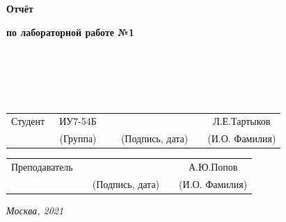 \begin{center}
	\vspace{3cm}
	{\bf\huge Отчёт\par}
	{\bf\Large по лабораторной работе №1\par}
	\vspace{0.5cm}
\end{center}


\noindent
{}
\\
\\\\
\noindent
{}
\\

\vspace{1.5cm}
\noindent
\begin{tabular}{l c c c c c}
	Студент      & ~ИУ7-54Б~               & \hspace{2.5cm} & \hspace{3cm}                 & &  Л.Е.Тартыков \\\cline{2-2}\cline{4-4} \cline{6-6}
	\hspace{3cm} & {\footnotesize(Группа)} &                & {\footnotesize(Подпись, дата)} & & {\footnotesize(И.О. Фамилия)}
\end{tabular}

\vspace{1cm}

\noindent
\begin{tabular}{l c c c c}
	Преподаватель & \hspace{5cm}   & \hspace{3cm}                 & & А.Ю.Попов \\\cline{3-3} \cline{5-5} 
	\hspace{3cm}  &                & {\footnotesize(Подпись, дата)} & & {\footnotesize(И.О. Фамилия)}
\end{tabular}

\begin{center}	
	\vfill
	\large \textit {Москва, 2021}
\end{center}

\thispagestyle {empty}
\pagebreak
